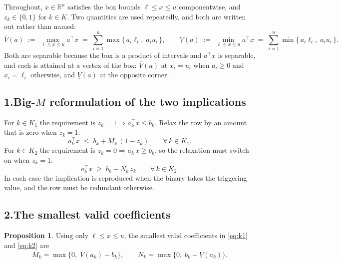 \documentclass[11pt]{article}
\DeclareMathOperator*{\minimize}{min}
\DeclareMathOperator*{\maximize}{max}
\theoremstyle{definition}\newtheorem*{definition}{Definition}
\newtheorem{proposition}{Proposition}
\theoremstyle{definition}
\begin{document}
Throughout, $x \in \mathbb{R}^n$ satisfies the box bounds
$\ell \le x \le u$ componentwise, and $z_k \in \{0,1\}$ for $k \in K$.
Two quantities are used repeatedly, and both are written out rather than
named:
\begin{equation}
  \overline{V}(a) \;:=\; \maximize_{\ell \le x \le u} a^{\!\top} x
  \;=\; \sum_{i=1}^{n} \max\{\, a_i \ell_i,\; a_i u_i \,\},
  \qquad
  \underline{V}(a) \;:=\; \minimize_{\ell \le x \le u} a^{\!\top} x
  \;=\; \sum_{i=1}^{n} \min\{\, a_i \ell_i,\; a_i u_i \,\} .
  \label{eq:VV}
\end{equation}
Both are separable because the box is a product of intervals and
$a^{\!\top}x$ is separable, and each is attained at a vertex of the box:
$\overline{V}(a)$ at $x_i = u_i$ when $a_i \ge 0$ and $x_i = \ell_i$
otherwise, and $\underline{V}(a)$ at the opposite corner.

\subsection*{1.\quad Big-$M$ reformulation of the two implications}

For $k \in K_1$ the requirement is
$z_k = 1 \Rightarrow a_k^{\!\top} x \le b_k$. Relax the row by an amount
that is zero when $z_k = 1$:
\begin{equation}
  a_k^{\!\top} x \;\le\; b_k + M_k\,(1 - z_k)
  \qquad \forall\, k \in K_1 .
  \label{eq:k1}
\end{equation}
For $k \in K_2$ the requirement is
$z_k = 0 \Rightarrow a_k^{\!\top} x \ge b_k$, so the relaxation must
switch on when $z_k = 1$:
\begin{equation}
  a_k^{\!\top} x \;\ge\; b_k - N_k\, z_k
  \qquad \forall\, k \in K_2 .
  \label{eq:k2}
\end{equation}
In each case the implication is reproduced when the binary takes the
triggering value, and the row must be redundant otherwise.

\subsection*{2.\quad The smallest valid coefficients}

\begin{proposition}
Using only $\ell \le x \le u$, the smallest valid coefficients in
\eqref{eq:k1} and \eqref{eq:k2} are
\[
  M_k = \max\big\{0,\; \overline{V}(a_k) - b_k \big\},
  \qquad
  N_k = \max\big\{0,\; b_k - \underline{V}(a_k) \big\} .
\]
\end{proposition}
\end{document}

